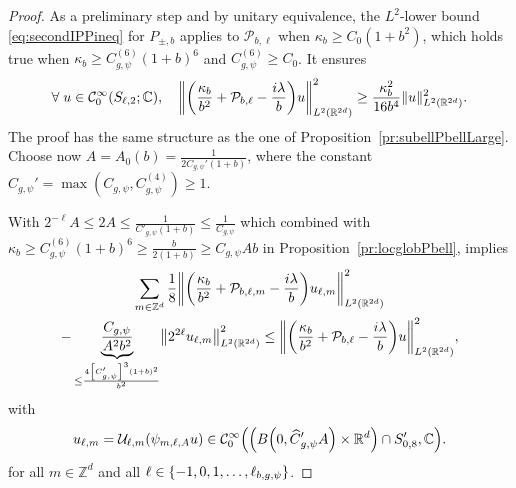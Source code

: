 \documentclass[10pt]{amsart}
\theoremstyle{definition}\newtheorem{defi}[theo]{Definition}\newtheorem{rema}[theo]{Remark}\newtheorem{exam}[theo]{Example}\newtheorem{exem}[theo]{Example}\newtheorem{nota}[theo]{Notation}
\newcommand{\C}{\mathbb{C}}
\newcommand{\Z}{\mathbb{Z}}
\newcommand{\R}{\mathbb{R}}
\newcommand{\clC}{\mathcal{C}}
\newcommand{\clP}{\mathcal{P}}
\newcommand{\clU}{\mathcal{U}}
\newcommand\norm[1]{\left\lVert#1\right\rVert}
\let\oldhat\hat
\renewcommand*{\hat}[1]{\mathchoice{\widehat{#1}}{\widehat{#1}}{\oldhat{#1}}{\oldhat{#1}}}
\let\oldforall\forall
\renewcommand*{\forall}{\mathrel{\oldforall}}
\let\originalleft\left
\let\originalright\right
\renewcommand{\left}{\mathopen{}\mathclose\bgroup\originalleft}
\renewcommand{\right}{\aftergroup\egroup\originalright}
\newcounter{setofstep}
\newcounter{step}[setofstep]
\begin{document}
\begin{proof}
As a preliminary step and by unitary equivalence, the $L^{2}$-lower bound \eqref{eq:secondIPPineq} for $P_{\pm,b}$ applies to $\clP_{b,\ell}$ when $\kappa_{b}\geq C_{0}(1+b^{2})$, which holds true when $\kappa_{b}\geq C_{g,\psi}^{(6)}(1+b)^{6}$ and $C_{g,\psi}^{(6)}\geq C_{0}$. It ensures
\begin{equation}\label{eq:prelstep}
\forall u\in \clC^{\infty}_{0}(S_{\ell,2};\C),\quad\left\|\left(\frac{\kappa_{b}}{b^{2}}+\clP_{b,\ell}-\frac{i\lambda}{b}\right)u
\right\|^{2}_{L^{2}(\R^{2d})}\geq \frac{\kappa_{b}^{2}}{16b^{4}}\|u\|^{2}_{L^{2}(\R^{2d})}.
\end{equation}
The proof has the same structure as the one of Proposition~\ref{pr:subellPbellLarge}. Choose now $A=A_0(b)=\frac{1}{2C_{{g,\psi}}'(1+b)}$, where the constant $C_{g,\psi}'=\max(C_{g,\psi},C^{(4)}_{g,\psi})\geq 1$.

With $2^{-\ell}A\leq 2A\leq \frac{1}{C'_{g,\psi}(1+b)}\leq \frac{1}{C_{g,\psi}}$ which combined with $\kappa_{b}\geq C_{g,\psi}^{(6)}(1+b)^{6}\geq \frac{b}{2(1+b)}\geq C_{g,\psi}Ab$ in Proposition~\ref{pr:locglobPbell}, implies
\begin{multline}\label{eq:minonew}
\sum_{m\in \Z^d}\frac{1}{8}\left\| \left(\frac{\kappa_{b}}{b^{2}}+\clP_{b,\ell,m} - \frac{i\lambda}{b}\right) u_{\ell,m}\right\|^{2}_{L^2(\R^{2d})}
\\
-\underbrace{\frac{C_{g,\psi}}{A^{2}b^2}}_{\leq \frac{4\left[C_{g,\psi}'\right]^{3}(1+b)^{2}}{b^{2}}}
\norm{2^{2\ell}u_{\ell,m}}_{L^2(\R^{2d})}^2
\leq
\left\|\left(\frac{\kappa_{b}}{b^{2}}+\clP_{b,\ell} - \frac{i\lambda}{b}\right) u \right\|^{2}_{L^2(\R^{2d})},
\end{multline}
with
\[
u_{\ell,m}=\clU_{\ell,m}(\psi_{m,\ell,A}u) \in \clC^\infty_0\left(\left(B\left(0,\hat{C}'_{g,\psi}A\right)\times \R^d\right)\cap S_{0,8}',\C\right).
\]
for all $m\in \Z^{d}$ and all $\ell\in\left\{-1,0,1,\dots,\ell_{b,g,\psi}\right\}$.


\end{proof}
\end{document}
